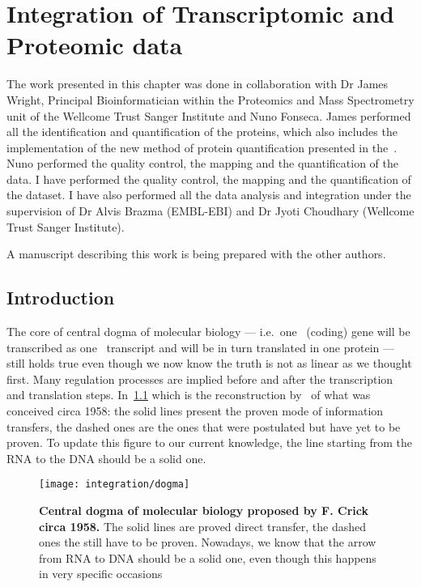 \chapter{Integration of Transcriptomic and Proteomic data}
\label{ch:Integration}
The work presented in this chapter was done in collaboration with Dr James Wright,
Principal Bioinformatician within the Proteomics and Mass Spectrometry unit of the
Wellcome Trust Sanger Institute and Nuno Fonseca. James performed all the
identification and quantification of the proteins, which also includes the
implementation of the new method of protein quantification presented in
the~. Nuno performed the quality
control, the mapping and the quantification of the  data.
I have performed the quality control, the mapping and the quantification of the
 dataset. I have also performed
all the data analysis and integration under the supervision of Dr Alvis Brazma
(EMBL-EBI) and Dr Jyoti Choudhary (Wellcome Trust Sanger Institute).

A manuscript describing this work is being prepared with the other authors.

\section{Introduction}
\label{sec:IntegrationIntro}

The core of central dogma of molecular biology --- i.e.\ one \DNA\ (coding) gene
will be transcribed as one \mRNA\ transcript and will be in turn translated in
one protein --- still holds true even though we now know the truth is not as
linear as we thought first. Many regulation processes are implied before
and after the transcription and translation steps.
In~\cref{fig:dogma} which is the reconstruction by~\cite{Crick:1958} of
what was conceived circa 1958: the solid lines present the proven mode of
information transfers, the dashed ones are the ones that were postulated but
have yet to be proven. To update this figure to our current knowledge, the line
starting from the RNA to the DNA should be a solid one.

\begin{figure}%
    \texttt{[image: integration/dogma]}\centering
    \caption[Central dogma of molecular biology proposed by F. Crick circa 1958]
    {\label{fig:dogma}\textbf{Central dogma of molecular biology proposed by
    F. Crick circa 1958.} The solid lines are proved direct transfer, the dashed
    ones the still have to be proven. Nowadays, we know that the arrow from RNA
    to DNA should be a solid one, even though this happens in very specific
    occasions}
\end{figure}


